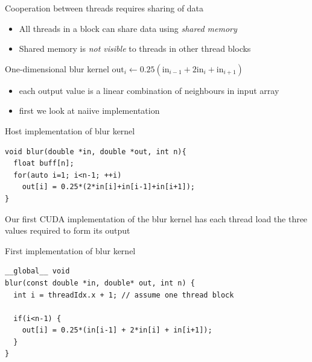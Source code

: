 \begin{frame}[fragile]{}
        Cooperation between threads requires sharing of data
        \begin{itemize}
            \item All threads in a block can share data using \emph{shared memory}
            \item Shared memory is \emph{not visible} to threads in other thread blocks
        \end{itemize}

\end{frame}

\begin{frame}[fragile]{}
    \begin{info}{One-dimensional blur kernel}
        \centering $\text{out}_i \leftarrow 0.25(\text{in}_{i-1}+2\text{in}_i+\text{in}_{i+1})$
        \begin{itemize}
            \item each output value is a linear combination of neighbours in input array
            \item first we look at naiive implementation
        \end{itemize}
    \end{info}

    \begin{code}{Host implementation of blur kernel}
        \begin{lstlisting}[style=boxcudatiny]
void blur(double *in, double *out, int n){
  float buff[n];
  for(auto i=1; i<n-1; ++i)
    out[i] = 0.25*(2*in[i]+in[i-1]+in[i+1]);
}
        \end{lstlisting}
    \end{code}

\end{frame}

\begin{frame}[fragile]{}
    \begin{center}
        Our first CUDA implementation of the blur kernel has each thread load the three values required to form its output
    \end{center}
    \begin{code}{First implementation of blur kernel}
        \begin{lstlisting}[style=boxcudatiny]
__global__ void
blur(const double *in, double* out, int n) {
  int i = threadIdx.x + 1; // assume one thread block

  if(i<n-1) {
    out[i] = 0.25*(in[i-1] + 2*in[i] + in[i+1]);
  }
}
        \end{lstlisting}
    \end{code}

\end{frame}

